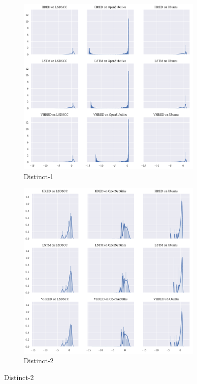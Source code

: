 \begin{figure}[H]
    \begin{subfigure}{0.5\linewidth}
        \centering
        \includegraphics[width=\linewidth]{figure/distplot_grid/distinct_1/plot.pdf}
        \caption{Distinct-1}
        \label{fig:distinct_1_dist_all}
    \end{subfigure}%
    \begin{subfigure}{0.5\linewidth}
        \centering
        \includegraphics[width=\linewidth]{figure/distplot_grid/distinct_2/plot.pdf}
        \caption{Distinct-2}
        \label{fig:distinct_2_dist_all}
    \end{subfigure}


\end{figure}
